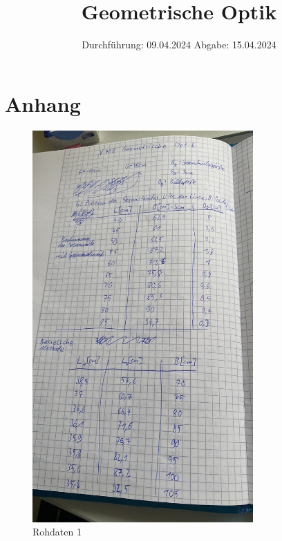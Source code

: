 

\subject{V408}
\title{Geometrische Optik}
\date{%
  Durchführung: 09.04.2024
  \hspace{3em}
  Abgabe: 15.04.2024
}



\maketitle
\thispagestyle{empty}
\tableofcontents
\newpage
 






\printbibliography{}

\section{Anhang}

\begin{figure}[H]
  \includegraphics[width=\textwidth, height=15cm, angle=270]{Bilder/Messdaten1.JPG}
  \caption{Rohdaten 1}
\end{figure}

